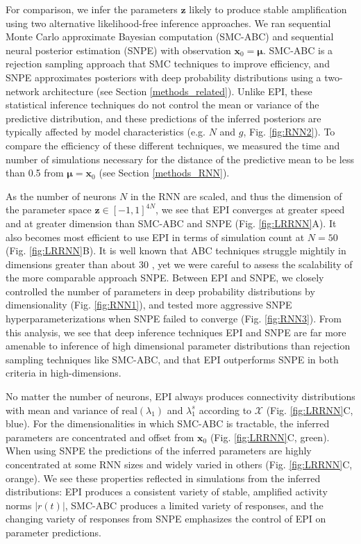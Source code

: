\documentclass[11pt]{article}
\begin{document}
For comparison, we infer the parameters $\mathbf{z}$ likely to produce stable amplification using two alternative likelihood-free inference approaches.
We ran sequential Monte Carlo approximate Bayesian computation (SMC-ABC) \cite{sisson2007sequential} and sequential neural posterior estimation (SNPE) \cite{gonccalves2019training} with observation $\mathbf{x}_0 = \bm{\mu}$.
SMC-ABC is a rejection sampling approach that SMC techniques to improve efficiency, and SNPE approximates posteriors with deep probability distributions using a two-network architecture (see Section \ref{methods_related}).
Unlike EPI, these statistical inference techniques do not control the mean or variance of the predictive distribution, and these predictions of the inferred posteriors are typically affected by model characteristics (e.g. $N$ and $g$, Fig. \ref{fig:RNN2}).
To compare the efficiency of these different techniques, we measured the time and number of simulations necessary for the distance of the predictive mean to be less than 0.5 from $\bm{\mu} = \mathbf{x}_0$ (see Section \ref{methods_RNN}).

As the number of neurons $N$ in the RNN are scaled, and thus the dimension of the parameter space $\mathbf{z} \in [-1, 1]^{4N}$, we see that EPI converges at greater speed and at greater dimension than SMC-ABC and SNPE (Fig. \ref{fig:LRRNN}A).
It also becomes most efficient to use EPI in terms of simulation count at $N=50$ (Fig. \ref{fig:LRRNN}B).
It is well known that ABC techniques struggle mightily in dimensions greater than about 30 \cite{sisson2018handbook}, yet we were careful to assess the scalability of the more comparable approach SNPE.
Between EPI and SNPE, we closely controlled the number of parameters in deep probability distributions by dimensionality (Fig. \ref{fig:RNN1}), and tested more aggressive SNPE hyperparameterizations when SNPE failed to converge (Fig. \ref{fig:RNN3}).
From this analysis, we see that deep inference techniques EPI and SNPE are far more amenable to inference of high dimensional parameter distributions than rejection sampling techniques like SMC-ABC, and that EPI outperforms SNPE in both criteria in high-dimensions.

No matter the number of neurons, EPI always produces connectivity distributions with mean and variance of $\text{real}(\lambda_1)$ and $\lambda_1^s$ according to $\mathcal{X}$ (Fig. \ref{fig:LRRNN}C, blue).
For the dimensionalities in which SMC-ABC is tractable, the inferred parameters are concentrated and offset from $\mathbf{x}_0$ (Fig. \ref{fig:LRRNN}C, green).
When using SNPE the predictions of the inferred parameters are highly concentrated at some RNN sizes and widely varied in others (Fig. \ref{fig:LRRNN}C, orange).
We see these properties reflected in simulations from the inferred distributions: EPI produces a consistent variety of stable, amplified activity norms $|r(t)|$, SMC-ABC produces a limited variety of responses, and the changing variety of responses from SNPE emphasizes the control of EPI on parameter predictions.
\end{document}
